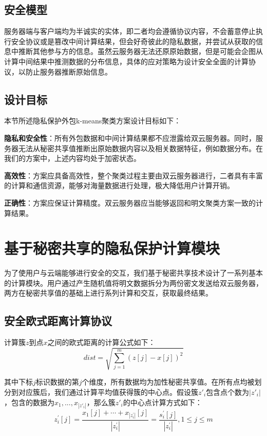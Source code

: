 \subsection{安全模型}
\label{s3-anquanmoxing}
服务器端与客户端均为半诚实的实体，即二者均会遵循协议内容，不会蓄意停止执行安全协议或是篡改中间计算结果，但会好奇彼此的隐私数据，并尝试从获取的信息中推断其他参与方的信息。虽然云服务器无法还原原始数据，但是可能会企图从计算中间结果中推测数据的分布信息，具体的应对策略为设计安全全面的计算协议，以防止服务器推断原始信息。
\subsection{设计目标}
本节所述隐私保护外包k-means聚类方案设计目标如下：
\begin{compactitem}
	\item \textbf{隐私和安全性}：所有外包数据和中间计算结果都不应泄露给双云服务器。同时，服务器无法从秘密共享值推断出原始数据内容以及相关数据特征，例如数据分布。在我们的方案中，上述内容均处于加密状态。
	\item \textbf{高效性}：方案应具备高效性，整个聚类过程主要由双云服务器进行，二者具有丰富的计算和通信资源，能够对海量数据进行处理，极大降低用户计算开销。
	\item \textbf{正确性}：方案应保证计算精度。双云服务器应当能够返回和明文聚类方案一致的计算结果。
\end{compactitem}
\section{基于秘密共享的隐私保护计算模块}
\label{s3-mokuai}
为了使用户与云端能够进行安全的交互，我们基于秘密共享技术设计了一系列基本的计算模块。用户通过产生随机值将明文数据拆分为两份密文发送给双云服务器，两方在秘密共享值的基础上进行系列计算和交互，获取最终结果。

\subsection{安全欧式距离计算协议}

计算簇$z$到点$x$之间的欧式距离的计算公式如下：
\begin{equation}
    \label{cal_dist}
    dist=\sqrt{\sum_{j=1}^m\left(z[j]-x[j]\right)^2}
\end{equation}

其中下标$j$标识数据的第$j$个维度，所有数据均为加性秘密共享值。在所有点均被划分到对应簇后，我们通过计算平均值获得簇的中心点。假设簇$z'_i$包含点个数为$|z'_i|$，包含的数据为${x_1,...,x_{|z'_i|}}$，那么簇$z'_i$的中心点计算方式如下：
\begin{equation}
    \label{cal_center}
    z_{i}^{\prime}[j]=\frac{x_{1}[j]+\cdots+x_{\left|z_{i}^{\prime}\right|}[j]}{\left|z_{i}^{\prime}\right|}=\frac{s_{i}^{\prime}[j]}{\left|z_{i}^{\prime}\right|}, 1 \leq j \leq m
\end{equation}

